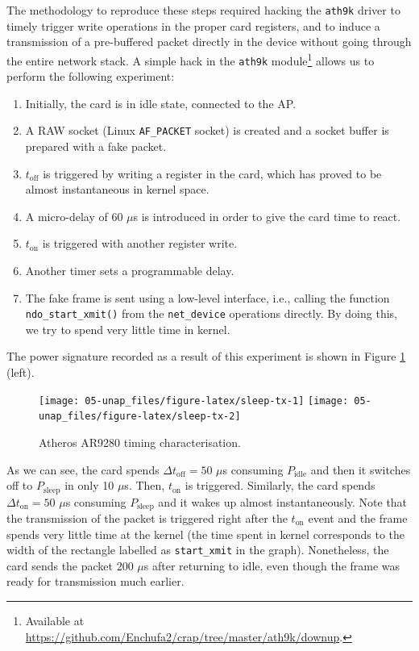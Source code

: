 \documentclass[twoside,nohyper]{tufte-book}
\providecommand{\tightlist}{%
  \setlength{\itemsep}{0pt}\setlength{\parskip}{0pt}}
\theoremstyle{definition}
\theoremstyle{definition}
\theoremstyle{definition}
\theoremstyle{remark}
\begin{document}
The methodology to reproduce these steps required hacking the
\texttt{ath9k} driver to timely trigger write operations in the proper
card registers, and to induce a transmission of a pre-buffered packet
directly in the device without going through the entire network stack. A
simple hack in the \texttt{ath9k} module\footnote{Available at
  \url{https://github.com/Enchufa2/crap/tree/master/ath9k/downup}.}
allows us to perform the following experiment:

\begin{enumerate}
\def\labelenumi{\arabic{enumi}.}
\setcounter{enumi}{-1}
\tightlist
\item
  Initially, the card is in idle state, connected to the AP.
\item
  A RAW socket (Linux \texttt{AF\_PACKET} socket) is created and a
  socket buffer is prepared with a fake packet.
\item
  \(t_\mathrm{off}\) is triggered by writing a register in the card,
  which has proved to be almost instantaneous in kernel space.
\item
  A micro-delay of 60 \(\mu\)s is introduced in order to give the card
  time to react.
\item
  \(t_\mathrm{on}\) is triggered with another register write.
\item
  Another timer sets a programmable delay.
\item
  The fake frame is sent using a low-level interface, i.e., calling the
  function \texttt{ndo\_start\_xmit()} from the \texttt{net\_device}
  operations directly. By doing this, we try to spend very little time
  in kernel.
\end{enumerate}

The power signature recorded as a result of this experiment is shown in
Figure \ref{fig:sleep-tx} (left).



\begin{figure}

{\centering \texttt{[image: 05-unap\_files/figure-latex/sleep-tx-1]} \texttt{[image: 05-unap\_files/figure-latex/sleep-tx-2]} 

}

\caption[Atheros AR9280 timing characterisation.]{Atheros AR9280 timing characterisation.}\label{fig:sleep-tx}
\end{figure}

As we can see, the card spends \(\Delta t_\mathrm{off} = 50\) \(\mu\)s
consuming \(P_\mathrm{idle}\) and then it switches off to
\(P_\mathrm{sleep}\) in only 10 \(\mu\)s. Then, \(t_\mathrm{on}\) is
triggered. Similarly, the card spends \(\Delta t_\mathrm{on} = 50\)
\(\mu\)s consuming \(P_\mathrm{sleep}\) and it wakes up almost
instantaneously. Note that the transmission of the packet is triggered
right after the \(t_\mathrm{on}\) event and the frame spends very little
time at the kernel (the time spent in kernel corresponds to the width of
the rectangle labelled as \texttt{start\_xmit} in the graph).
Nonetheless, the card sends the packet 200 \(\mu\)s after returning to
idle, even though the frame was ready for transmission much earlier.
\end{document}

